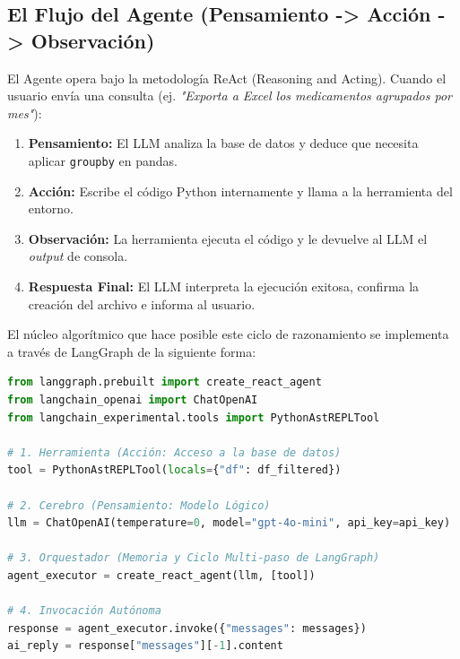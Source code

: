 \documentclass[12pt,a4paper]{article}
\begin{document}
\subsection{El Flujo del Agente (Pensamiento -> Acción -> Observación)}
El Agente opera bajo la metodología ReAct (Reasoning and Acting). Cuando el usuario envía una consulta (ej. \textit{"Exporta a Excel los medicamentos agrupados por mes"}):
\begin{enumerate}
    \item \textbf{Pensamiento:} El LLM analiza la base de datos y deduce que necesita aplicar \texttt{groupby} en pandas.
    \item \textbf{Acción:} Escribe el código Python internamente y llama a la herramienta del entorno.
    \item \textbf{Observación:} La herramienta ejecuta el código y le devuelve al LLM el \textit{output} de consola.
    \item \textbf{Respuesta Final:} El LLM interpreta la ejecución exitosa, confirma la creación del archivo e informa al usuario.
\end{enumerate}

El núcleo algorítmico que hace posible este ciclo de razonamiento se implementa a través de LangGraph de la siguiente forma:

\begin{lstlisting}[language=Python, caption=Implementación de Arquitectura ReAct con LangGraph]
from langgraph.prebuilt import create_react_agent
from langchain_openai import ChatOpenAI
from langchain_experimental.tools import PythonAstREPLTool

# 1. Herramienta (Acción: Acceso a la base de datos)
tool = PythonAstREPLTool(locals={"df": df_filtered})

# 2. Cerebro (Pensamiento: Modelo Lógico)
llm = ChatOpenAI(temperature=0, model="gpt-4o-mini", api_key=api_key)

# 3. Orquestador (Memoria y Ciclo Multi-paso de LangGraph)
agent_executor = create_react_agent(llm, [tool])

# 4. Invocación Autónoma
response = agent_executor.invoke({"messages": messages})
ai_reply = response["messages"][-1].content
\end{lstlisting}
\end{document}
